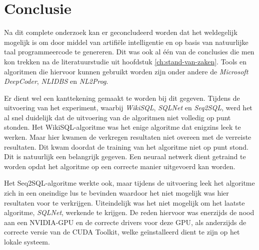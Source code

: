 
\chapter{Conclusie}
\label{ch:conclusie}


Na dit complete onderzoek kan er geconcludeerd worden dat het weldegelijk mogelijk is om door middel van artifiële intelligentie en op basis van natuurlijke taal programmeercode te genereren. Dit was ook al één van de conclusies die men kon trekken na de literatuurstudie uit hoofdstuk \ref{ch:stand-van-zaken}. Tools en algoritmen die hiervoor kunnen gebruikt worden zijn onder andere de \textit{Microsoft DeepCoder}, \textit{NLIDBS} en \textit{NL2Prog}.

Er dient wel een kanttekening gemaakt te worden bij dit gegeven. Tijdens de uitvoering van het experiment, waarbij \textit{WikiSQL}, \textit{SQLNet} en \textit{Seq2SQL}, werd het al snel duidelijk dat de uitvoering van de algoritmen niet volledig op punt stonden. Het WikiSQL-algoritme was het enige algoritme dat enigzins leek te werken. Maar hier kwamen de verkregen resultaten niet overeen met de verreiste resultaten. Dit kwam doordat de training van het algoritme niet op punt stond. Dit is natuurlijk een belangrijk gegeven. Een neuraal netwerk dient getraind te worden opdat het algoritme op een correcte manier uitgevoerd kan worden.

Het Seq2SQL-algoritme werkte ook, maar tijdens de uitvoering leek het algoritme zich in een oneindige lus te bevinden waardoor het niet mogelijk was hier resultaten voor te verkrijgen. Uiteindelijk was het niet mogelijk om het laatste algoritme, \textit{SQLNet}, werkende te krijgen. De reden hiervoor was enerzijds de nood aan een NVIDIA-GPU en de correcte drivers voor deze GPU, als anderzijds de correcte versie van de CUDA Toolkit, welke geïnstalleerd dient te zijn op het lokale systeem.

